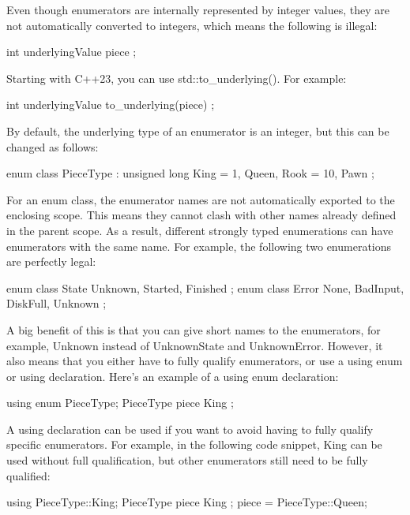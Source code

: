 Even though enumerators are internally represented by integer values, they are not automatically converted to integers, which means the following is illegal:

\begin{cpp}
int underlyingValue { piece };
\end{cpp}


Starting with C++23, you can use std::to\_underlying(). For example:

\begin{cpp}
int underlyingValue { to_underlying(piece) };
\end{cpp}

By default, the underlying type of an enumerator is an integer, but this can be changed as follows:

\begin{cpp}
enum class PieceType : unsigned long
{
    King = 1,
    Queen,
    Rook = 10,
    Pawn
};
\end{cpp}

For an enum class, the enumerator names are not automatically exported to the enclosing scope. This means they cannot clash with other names already defined in the parent scope. As a result, different strongly typed enumerations can have enumerators with the same name. For example, the following two enumerations are perfectly legal:

\begin{cpp}
enum class State { Unknown, Started, Finished };
enum class Error { None, BadInput, DiskFull, Unknown };
\end{cpp}

A big benefit of this is that you can give short names to the enumerators, for example, Unknown instead of UnknownState and UnknownError. However, it also means that you either have to fully qualify enumerators, or use a using enum or using declaration. Here’s an example of a using enum declaration:

\begin{cpp}
using enum PieceType;
PieceType piece { King };
\end{cpp}

A using declaration can be used if you want to avoid having to fully qualify specific enumerators. For example, in the following code snippet, King can be used without full qualification, but other enumerators still need to be fully qualified:

\begin{cpp}
using PieceType::King;
PieceType piece { King };
piece = PieceType::Queen;
\end{cpp}

